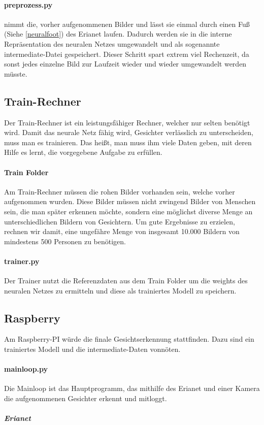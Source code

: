 \documentclass[12pt]{article}
\begin{document}
\paragraph{preprozess.py}
nimmt die, vorher aufgenommenen Bilder und lässt sie einmal 
durch einen Fuß (Siehe \ref{neuralfoot}) des Erianet laufen. Dadurch
werden sie in die interne Repräsentation des neuralen Netzes 
umgewandelt und als sogenannte intermediate-Datei gespeichert.
Dieser Schritt spart extrem viel Rechenzeit, da sonst
jedes einzelne Bild zur Laufzeit wieder und wieder 
umgewandelt werden müsste.
\subsection{Train-Rechner}
Der Train-Rechner ist ein leistungsfähiger Rechner, welcher nur selten
benötigt wird. Damit das neurale Netz fähig wird, Gesichter verlässlich
zu unterscheiden, muss man es trainieren. Das heißt, man muss ihm viele
Daten geben, mit deren Hilfe es lernt, die vorgegebene Aufgabe zu erfüllen.
\paragraph{Train Folder} Am Train-Rechner müssen die rohen
Bilder vorhanden sein, welche vorher aufgenommen wurden.
Diese Bilder müssen nicht zwingend Bilder von Menschen sein,
die man später erkennen möchte, sondern eine möglichst diverse
Menge an unterschiedlichen Bildern von Gesichtern. Um gute Ergebnisse
zu erzielen, rechnen wir damit, eine ungefähre Menge von insgesamt
10.000 Bildern von mindestens 500 Personen zu benötigen.
\paragraph{trainer.py}
Der Trainer nutzt die Referenzdaten aus dem Train Folder 
um die weights des neuralen Netzes zu ermitteln und diese
als trainiertes Modell zu speichern.
\subsection{Raspberry}
Am Raspberry-PI würde die finale Gesichtserkennung stattfinden.
Dazu sind ein trainiertes Modell und die intermediate-Daten vonnöten.
\paragraph{mainloop.py}
Die Mainloop ist das Hauptprogramm, das mithilfe des Erianet und einer Kamera
die aufgenommenen Gesichter erkennt und mitloggt.
\subparagraph{Erianet}
\end{document}
